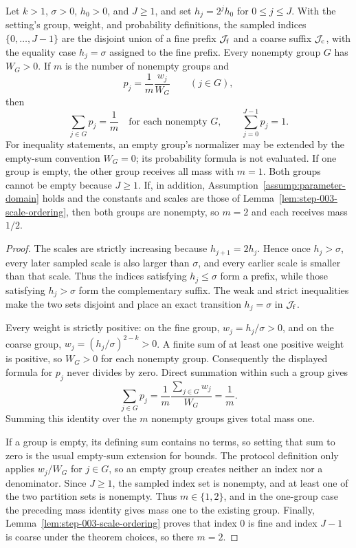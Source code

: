 \begin{proposition}\label{prop:step-003-group-law}
Let \(k>1\), \(\sigma>0\), \(h_0>0\), and \(J\geq1\), and set
\(h_j=2^jh_0\) for \(0\leq j\leq J\). With the setting's group, weight,
and probability definitions, the sampled indices \(\{0,\ldots,J-1\}\)
are the disjoint union of a fine prefix
\(\mathcal J_{\rm f}\) and a coarse suffix \(\mathcal J_{\rm c}\), with
the equality case \(h_j=\sigma\) assigned to the fine prefix. Every nonempty
group \(G\) has \(W_G>0\). If \(m\) is the number of nonempty groups and
\[
p_j=\frac1m\frac{w_j}{W_G}\qquad(j\in G),
\]
then
\[
\sum_{j\in G}p_j=\frac1m
\quad\text{for each nonempty }G,
\qquad
\sum_{j=0}^{J-1}p_j=1.
\]
For inequality statements, an empty group's normalizer may be extended by the
empty-sum convention \(W_G=0\); its probability formula is not evaluated. If
one group is empty, the other group receives all mass with \(m=1\). Both
groups cannot be empty because \(J\geq1\). If, in addition,
Assumption~\ref{assump:parameter-domain} holds and the constants and scales
are those of Lemma~\ref{lem:step-003-scale-ordering}, then both groups are
nonempty, so \(m=2\) and each receives mass \(1/2\).
\end{proposition}

\begin{proof}
The scales are strictly increasing because
\(h_{j+1}=2h_j\). Hence once \(h_j>\sigma\), every later sampled scale is
also larger than \(\sigma\), and every earlier scale is smaller than that
scale. Thus the indices satisfying \(h_j\leq\sigma\) form a prefix, while
those satisfying \(h_j>\sigma\) form the complementary suffix. The weak and
strict inequalities make the two sets disjoint and place an exact transition
\(h_j=\sigma\) in \(\mathcal J_{\rm f}\).

Every weight is strictly positive: on the fine group,
\(w_j=h_j/\sigma>0\), and on the coarse group,
\(w_j=(h_j/\sigma)^{2-k}>0\). A finite sum of at least one positive weight is
positive, so \(W_G>0\) for each nonempty group. Consequently the displayed
formula for \(p_j\) never divides by zero. Direct summation within such a
group gives
\[
\sum_{j\in G}p_j
=\frac1m\frac{\sum_{j\in G}w_j}{W_G}
=\frac1m.
\]
Summing this identity over the \(m\) nonempty groups gives total mass one.

If a group is empty, its defining sum contains no terms, so setting that sum
to zero is the usual empty-sum extension for bounds. The protocol definition
only applies \(w_j/W_G\) for \(j\in G\), so an empty group creates neither an
index nor a denominator. Since \(J\geq1\), the sampled index set is nonempty,
and at least one of the two partition sets is nonempty. Thus \(m\in\{1,2\}\),
and in the one-group case the preceding mass identity gives mass one to the
existing group. Finally,
Lemma~\ref{lem:step-003-scale-ordering} proves that index \(0\) is fine
and index \(J-1\) is coarse under the theorem choices, so there \(m=2\).
\end{proof}

